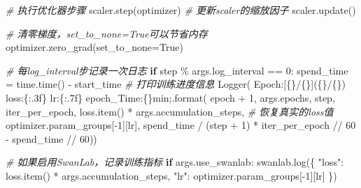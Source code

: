 \documentclass[
]{article}
\newenvironment{Shaded}{}{}
\newcommand{\BuiltInTok}[1]{\textcolor[rgb]{0.00,0.50,0.00}{#1}}
\newcommand{\CommentTok}[1]{\textcolor[rgb]{0.38,0.63,0.69}{\textit{#1}}}
\newcommand{\ControlFlowTok}[1]{\textcolor[rgb]{0.00,0.44,0.13}{\textbf{#1}}}
\newcommand{\DecValTok}[1]{\textcolor[rgb]{0.25,0.63,0.44}{#1}}
\newcommand{\NormalTok}[1]{#1}
\newcommand{\OperatorTok}[1]{\textcolor[rgb]{0.40,0.40,0.40}{#1}}
\newcommand{\SpecialCharTok}[1]{\textcolor[rgb]{0.25,0.44,0.63}{#1}}
\newcommand{\StringTok}[1]{\textcolor[rgb]{0.25,0.44,0.63}{#1}}
\newcommand{\VariableTok}[1]{\textcolor[rgb]{0.10,0.09,0.49}{#1}}
\begin{document}
\begin{Shaded}
\begin{Highlighting}[]
            \CommentTok{\# 执行优化器步骤}
\NormalTok{            scaler.step(optimizer)}
            \CommentTok{\# 更新scaler的缩放因子}
\NormalTok{            scaler.update()}

            \CommentTok{\# 清零梯度，set\_to\_none=True可以节省内存}
\NormalTok{            optimizer.zero\_grad(set\_to\_none}\OperatorTok{=}\VariableTok{True}\NormalTok{)}

        \CommentTok{\# 每log\_interval步记录一次日志}
        \ControlFlowTok{if}\NormalTok{ step }\OperatorTok{\%}\NormalTok{ args.log\_interval }\OperatorTok{==} \DecValTok{0}\NormalTok{:}
\NormalTok{            spend\_time }\OperatorTok{=}\NormalTok{ time.time() }\OperatorTok{{-}}\NormalTok{ start\_time}
            \CommentTok{\# 打印训练进度信息}
\NormalTok{            Logger(}
                \StringTok{\textquotesingle{}Epoch:[}\SpecialCharTok{\{\}}\StringTok{/}\SpecialCharTok{\{\}}\StringTok{](}\SpecialCharTok{\{\}}\StringTok{/}\SpecialCharTok{\{\}}\StringTok{) loss:}\SpecialCharTok{\{:.3f\}}\StringTok{ lr:}\SpecialCharTok{\{:.7f\}}\StringTok{ epoch\_Time:}\SpecialCharTok{\{\}}\StringTok{min;\textquotesingle{}}\NormalTok{.}\BuiltInTok{format}\NormalTok{(}
\NormalTok{                    epoch }\OperatorTok{+} \DecValTok{1}\NormalTok{,}
\NormalTok{                    args.epochs,}
\NormalTok{                    step,}
\NormalTok{                    iter\_per\_epoch,}
\NormalTok{                    loss.item() }\OperatorTok{*}\NormalTok{ args.accumulation\_steps,  }\CommentTok{\# 恢复真实的loss值}
\NormalTok{                    optimizer.param\_groups[}\OperatorTok{{-}}\DecValTok{1}\NormalTok{][}\StringTok{\textquotesingle{}lr\textquotesingle{}}\NormalTok{],}
\NormalTok{                    spend\_time }\OperatorTok{/}\NormalTok{ (step }\OperatorTok{+} \DecValTok{1}\NormalTok{) }\OperatorTok{*}\NormalTok{ iter\_per\_epoch }\OperatorTok{//} \DecValTok{60} \OperatorTok{{-}}\NormalTok{ spend\_time }\OperatorTok{//} \DecValTok{60}\NormalTok{))}
            
            \CommentTok{\# 如果启用SwanLab，记录训练指标}
            \ControlFlowTok{if}\NormalTok{ args.use\_swanlab:}
\NormalTok{                swanlab.log(\{}
                    \StringTok{"loss"}\NormalTok{: loss.item() }\OperatorTok{*}\NormalTok{ args.accumulation\_steps,}
                    \StringTok{"lr"}\NormalTok{: optimizer.param\_groups[}\OperatorTok{{-}}\DecValTok{1}\NormalTok{][}\StringTok{\textquotesingle{}lr\textquotesingle{}}\NormalTok{]}
\NormalTok{                \})}


\end{Highlighting}
\end{Shaded}
\end{document}
